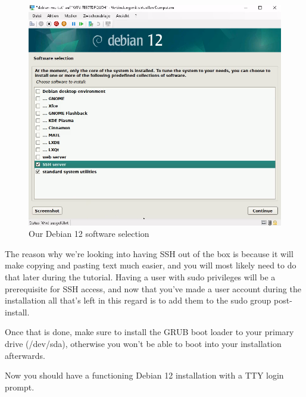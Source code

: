 \documentclass[]{article}
\begin{document}
\begin{figure}[h]
	\caption{Our Debian 12 software selection}
	\centering
	\includegraphics[width=1\textwidth]{debian-software-selection}
\end{figure}
\FloatBarrier

The reason why we're looking into having SSH out of the box is because it will make copying and pasting text much easier, and you will most likely need to do that later during the tutorial. Having a user with sudo privileges will be a prerequisite for SSH access, and now that you've made a user account during the installation all that's left in this regard is to add them to the sudo group post-install.

Once that is done, make sure to install the GRUB boot loader to your primary drive (/dev/sda), otherwise you won't be able to boot into your installation afterwards.

Now you should have a functioning Debian 12 installation with a TTY login prompt.
\end{document}
